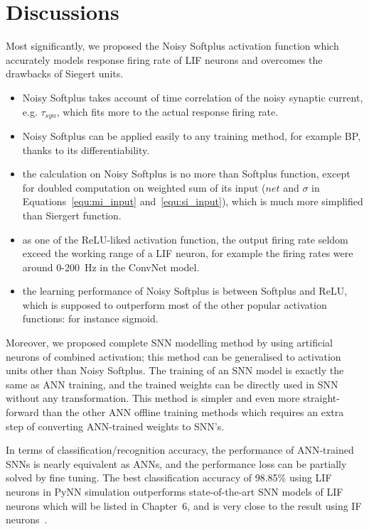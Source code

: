 \documentclass{article}
\begin{document}
\section{Discussions}
	Most significantly, we proposed the Noisy Softplus activation function which accurately models response firing rate of LIF neurons and overcomes the drawbacks of Siegert units.
\begin{itemize}
	\item Noisy Softplus takes account of time correlation of the noisy synaptic current, e.g. $\tau_{syn}$, which fits more to the actual response firing rate.
	
	\item Noisy Softplus can be applied easily to any training method, for example BP, thanks to its differentiability.
	
	\item the calculation on Noisy Softplus is no more than Softplus function, except for doubled computation on weighted sum of its input ($net$ and $\sigma$ in Equations~\ref{equ:mi_input} and~\ref{equ:si_input}), which is much more simplified than Siergert function.
	
	\item as one of the ReLU-liked activation function, the output firing rate seldom exceed the working range of a LIF neuron, for example the firing rates were around 0-200~Hz in the ConvNet model.
	
	\item the learning performance of Noisy Softplus is between Softplus and ReLU, which is supposed to outperform most of the other popular activation functions: for instance sigmoid.
\end{itemize}
Moreover, we proposed complete SNN modelling method by using artificial neurons of combined activation;
this method can be generalised to activation units other than Noisy Softplus.
The training of an SNN model is exactly the same as ANN training, and the trained weights can be directly used in SNN without any transformation.
This method is simpler and even more straight-forward than the other ANN offline training methods which requires an extra step of converting ANN-trained weights to SNN's.

In terms of classification/recognition accuracy, the performance of ANN-trained SNNs is nearly equivalent as ANNs, and the performance loss can  be partially solved by fine tuning.
The best classification accuracy of 98.85\% using LIF neurons in PyNN simulation outperforms state-of-the-art SNN models of LIF neurons which will be listed in Chapter~6, and is very close to the result using IF neurons~\cite{diehl2015fast}.
\end{document}
